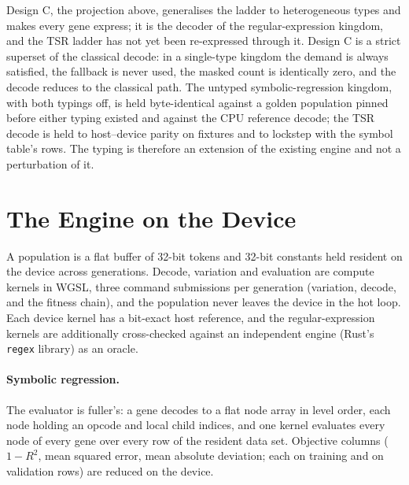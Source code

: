 \documentclass[sigconf,nonacm]{acmart}
\begin{document}
Design C, the projection above, generalises the ladder to
heterogeneous types and makes every gene express; it is the decoder of the
regular-expression kingdom, and the TSR ladder has not yet been re-expressed
through it. Design C is a strict superset of the classical decode: in a
single-type kingdom the demand is always satisfied, the fallback is never used,
the masked count is identically zero, and the decode reduces to the classical
path. The untyped symbolic-regression kingdom, with both typings off, is held
byte-identical against a golden population pinned before either typing existed
and against the CPU reference decode; the TSR decode is held to host--device
parity on fixtures and to lockstep with the symbol table's rows. The typing is
therefore an extension of the existing engine and not a perturbation of it.

\section{The Engine on the Device}
\label{sec:engine}

A population is a flat buffer of 32-bit tokens and 32-bit constants held
resident on the device across generations. Decode, variation and evaluation are
compute kernels in WGSL, three command submissions per generation (variation,
decode, and the fitness chain), and the population never leaves the device in
the hot loop. Each device kernel has a
bit-exact host reference, and the regular-expression kernels are additionally
cross-checked against an independent engine (Rust's \texttt{regex} library) as an
oracle.

\paragraph{Symbolic regression.} The evaluator is fuller's: a gene decodes to a
flat node array in level order, each node holding an opcode and local child
indices, and one kernel evaluates every node of every gene over every row of the
resident data set. Objective columns ($1\!-\!R^2$, mean squared error, mean
absolute deviation; each on training and on validation rows) are reduced on the
device.
\end{document}
